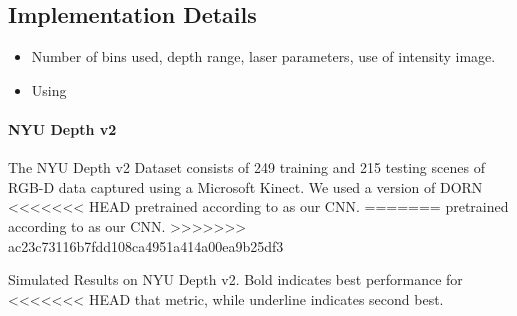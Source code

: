 \subsection{Implementation Details}
\begin{itemize}
  \item Number of bins used, depth range, laser parameters, use of intensity
    image.
  \item Using
\end{itemize}
\paragraph{NYU Depth v2}
The NYU Depth v2 Dataset consists of 249 training and 215 testing scenes of
RGB-D data captured using a Microsoft Kinect. We used a version of DORN
<<<<<<< HEAD
pretrained according to \cite{Fu. et al} as our CNN.
=======
pretrained according to \cite{Fu2018} as our CNN.
>>>>>>> ac23c73116b7fdd108ca4951a414a00ea9b25df3
\newpage
\begin{table*}
\begin{center}

\caption{Simulated Results on NYU Depth v2. Bold indicates best performance for
<<<<<<< HEAD
  that metric, while underline indicates second best.}
\end{center}
\end{table*}

